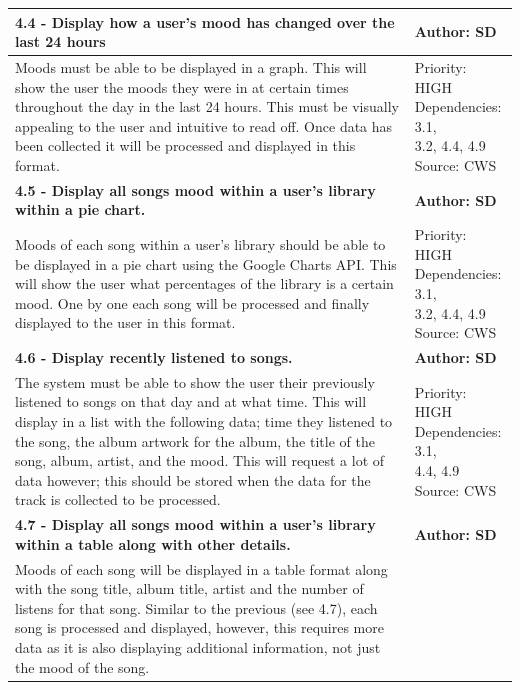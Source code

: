 \documentclass[10pt, notitlepage]{report}
\begin{document}
\begin{center}
\begin{longtable}{| p{13cm} | p{3cm} |}
\hline
\textbf{4.4 - Display how a user’s mood has changed over the last 24 hours} & \textbf{Author: SD} \\
\hline
Moods must be able to be displayed in a graph. This will show the user the  moods they were in at certain times throughout the day in the last 24 hours. This must be visually appealing to the user and intuitive to read off. Once data has been collected it will be processed and displayed in this format. &
\makecell{Priority: HIGH\\Dependencies: 3.1,\\3.2, 4.4, 4.9\\Source: CWS}\\
\hline
\textbf{4.5 - Display all songs mood within a user’s library within a pie chart.} & \textbf{Author: SD} \\
\hline
Moods of each song within a user’s library should be able to be displayed in a pie chart using the Google Charts API. This will show the user what percentages of the library is a certain mood. One by one each song will be processed and finally displayed to the user in this format.& 
\makecell{Priority: HIGH\\Dependencies: 3.1,\\3.2, 4.4, 4.9\\Source: CWS}\\
\hline
\textbf{4.6 - Display recently listened to songs.} & \textbf{Author: SD} \\
\hline
The system must be able to show the user their previously listened to songs on that day and at what time. This will display in a list with the following data; time they listened to the song, the album artwork for the album, the title of the song, album, artist, and the mood. This will request a lot of data however; this should be stored when the data for the track is collected to be processed.&
\makecell{Priority: HIGH\\Dependencies: 3.1,\\4.4, 4.9\\Source: CWS}\\
\hline
\textbf{4.7 - Display all songs mood within a user’s library within a table along with other details.} & \textbf{Author: SD} \\
\hline
Moods of each song will be displayed in a table format along with the song title, album title, artist and the number of listens for that song. Similar to the previous (see 4.7), each song is processed and displayed, however, this requires more data as it is also displaying additional information, not just the mood of the song. & 

\end{longtable}
\end{center}
\end{document}
